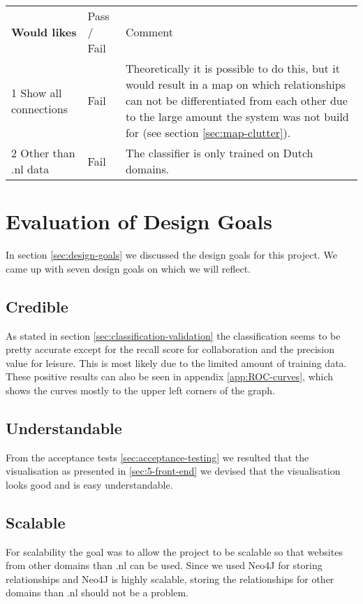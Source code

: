 \begin{table}[H]
\begin{tabular}{ll m{8cm}}
\textbf{Would likes}                    & Pass / Fail & Comment                                                                                                                                                                                                                               \\
1 Show all connections         & Fail        & Theoretically it is possible to do this, but it would result in a map on which relationships can not be differentiated from each other due to the large amount the system was not build for (see section \ref{sec:map-clutter}). \\ \hline
2 Other than .nl data          & Fail        & The classifier is only trained on Dutch domains.                                                                 
\end{tabular}
\end{table}

\section{Evaluation of Design Goals}
In section \ref{sec:design-goals} we discussed the design goals for this project. We came up with seven design goals on which we will reflect.

\subsection{Credible}
As stated in section \ref{sec:classification-validation} the classification seems to be pretty accurate except for the recall score for collaboration and the precision value for leisure. This is most likely due to the limited amount of training data. These positive results can also be seen in appendix \ref{app:ROC-curves}, which shows the curves mostly to the upper left corners of the graph.

\subsection{Understandable}
From the acceptance tests \ref{sec:acceptance-testing} we resulted that the visualisation as presented in \ref{sec:5-front-end} we devised that the visualisation looks good and is easy understandable.

\subsection{Scalable}
For scalability the goal was to allow the project to be scalable so that websites from other domains than .nl can be used. Since we used Neo4J for storing relationships and Neo4J is highly scalable, storing the relationships for other domains than .nl should not be a problem. 

